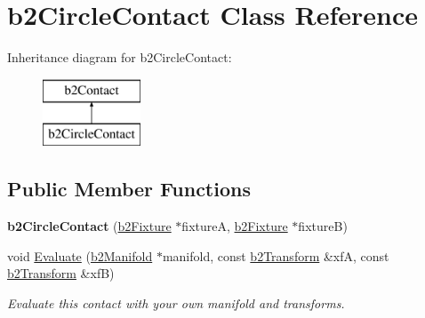 \hypertarget{classb2_circle_contact}{}\section{b2\+Circle\+Contact Class Reference}
\label{classb2_circle_contact}
Inheritance diagram for b2\+Circle\+Contact\+:\begin{figure}[H]
\begin{center}
\leavevmode
\includegraphics[height=2.000000cm]{classb2_circle_contact}
\end{center}
\end{figure}
\subsection*{Public Member Functions}
\begin{DoxyCompactItemize}
\item 
{\bfseries b2\+Circle\+Contact} (\hyperlink{classb2_fixture}{b2\+Fixture} $\ast$fixtureA, \hyperlink{classb2_fixture}{b2\+Fixture} $\ast$fixtureB)\hypertarget{classb2_circle_contact_a77e06c857edb2ca171340898f09ef789}{}\label{classb2_circle_contact_a77e06c857edb2ca171340898f09ef789}

\item 
void \hyperlink{classb2_circle_contact_ac0651dda773561b8561b8efa3cd31d5c}{Evaluate} (\hyperlink{structb2_manifold}{b2\+Manifold} $\ast$manifold, const \hyperlink{structb2_transform}{b2\+Transform} \&xfA, const \hyperlink{structb2_transform}{b2\+Transform} \&xfB)\hypertarget{classb2_circle_contact_ac0651dda773561b8561b8efa3cd31d5c}{}\label{classb2_circle_contact_ac0651dda773561b8561b8efa3cd31d5c}

\begin{DoxyCompactList}\small\item\em Evaluate this contact with your own manifold and transforms. \end{DoxyCompactList}\end{DoxyCompactItemize}
